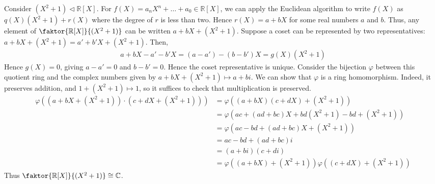 \begin{example}
	Consider $(X^2 + 1) \triangleleft \mathbb R[X]$.
	For $f(X) = a_n X^n + \dots + a_0 \in \mathbb R[X]$, we can apply the Euclidean algorithm to write $f(X)$ as $q(X) (X^2 + 1) + r(X)$ where the degree of $r$ is less than two.
	Hence $r(X) = a+bX$ for some real numbers $a$ and $b$.
	Thus, any element of $\faktor{\mathbb R[X]}{(X^2 + 1)}$ can be written $a+bX + (X^2 + 1)$.
	Suppose a coset can be represented by two representatives: $a+bX + (X^2+1) = a' + b'X + (X^2 + 1)$.
	Then,
	\begin{align*}
		a+bX - a' - b'X = (a-a') - (b-b')X = g(X) (X^2 + 1)
	\end{align*}
	Hence $g(X) = 0$, giving $a-a' = 0$ and $b-b' = 0$.
	Hence the coset representative is unique.
	Consider the bijection $\varphi$ between this quotient ring and the complex numbers given by $a+bX + (X^2 + 1) \mapsto a+bi$.
	We can show that $\varphi$ is a ring homomorphism.
	Indeed, it preserves addition, and $1 + (X^2 + 1) \mapsto 1$, so it suffices to check that multiplication is preserved.
	\begin{align*}
		\varphi((a+bX + (X^2 + 1)) \cdot (c+dX + (X^2 + 1))) & = \varphi((a+bX)(c+dX) + (X^2 + 1))                        \\
		                                                     & = \varphi(ac + (ad + bc)X + bd (X^2 + 1) - bd + (X^2 + 1)) \\
		                                                     & = \varphi(ac-bd+(ad+bc)X + (X^2 + 1))                      \\
		                                                     & = ac - bd + (ad + bc)i                                     \\
		                                                     & = (a+bi)(c+di)                                             \\
		                                                     & = \varphi((a+bX) + (X^2 + 1)) \varphi((c+dX) + (X^2 + 1))
	\end{align*}
	Thus $\faktor{\mathbb R[X]}{(X^2 + 1)} \cong \mathbb C$.
\end{example}


